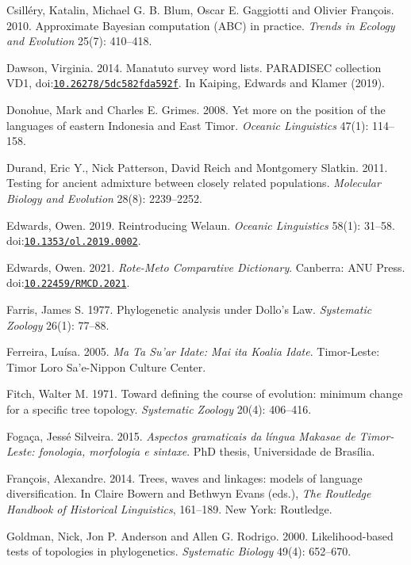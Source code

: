 \documentclass[11pt]{article}
\newcommand{\doi}[1]{doi:\href{https://doi.org/#1}{\nolinkurl{#1}}}
\begin{document}
\begin{thebibliography}{}
Csilléry, Katalin, Michael G. B. Blum, Oscar E. Gaggiotti and Olivier François. 2010. Approximate Bayesian computation (ABC) in practice. \emph{Trends in Ecology and Evolution} 25(7): 410--418.

Dawson, Virginia. 2014. Manatuto survey word lists. PARADISEC collection VD1, \doi{10.26278/5dc582fda592f}. In Kaiping, Edwards and Klamer (2019).

Donohue, Mark and Charles E. Grimes. 2008. Yet more on the position of the languages of eastern Indonesia and East Timor. \emph{Oceanic Linguistics} 47(1): 114--158.

Durand, Eric Y., Nick Patterson, David Reich and Montgomery Slatkin. 2011. Testing for ancient admixture between closely related populations. \emph{Molecular Biology and Evolution} 28(8): 2239--2252.

Edwards, Owen. 2019. Reintroducing Welaun. \emph{Oceanic Linguistics} 58(1): 31--58. \doi{10.1353/ol.2019.0002}.

Edwards, Owen. 2021. \emph{Rote-Meto Comparative Dictionary}. Canberra: ANU Press. \doi{10.22459/RMCD.2021}.

Farris, James S. 1977. Phylogenetic analysis under Dollo's Law. \emph{Systematic Zoology} 26(1): 77--88.

Ferreira, Luísa. 2005. \emph{Ma Ta Su'ar Idate: Mai ita Koalia Idate}. Timor-Leste: Timor Loro Sa'e-Nippon Culture Center.

Fitch, Walter M. 1971. Toward defining the course of evolution: minimum change for a specific tree topology. \emph{Systematic Zoology} 20(4): 406--416.

Fogaça, Jessé Silveira. 2015. \emph{Aspectos gramaticais da língua Makasae de Timor-Leste: fonologia, morfologia e sintaxe}. PhD thesis, Universidade de Brasília.

François, Alexandre. 2014. Trees, waves and linkages: models of language diversification. In Claire Bowern and Bethwyn Evans (eds.), \emph{The Routledge Handbook of Historical Linguistics}, 161--189. New York: Routledge.

Goldman, Nick, Jon P. Anderson and Allen G. Rodrigo. 2000. Likelihood-based tests of topologies in phylogenetics. \emph{Systematic Biology} 49(4): 652--670.


\end{thebibliography}
\end{document}
